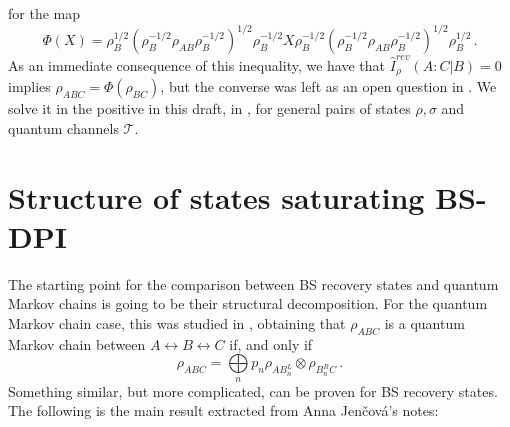 \documentclass[11pt]{article}
\theoremstyle{newdefinition}
\theoremstyle{newplain}
\theoremstyle{myplain}
\DeclareMathOperator{\1}{\mathds{1}}
\begin{document}
for the map
\begin{equation}\label{MapPhi}
    \Phi(X) = \rho_B^{1/2}(\rho_B^{-1/2}\rho_{AB}\rho_B^{-1/2})^{1/2}\rho_B^{-1/2}X\rho_B^{-1/2}(\rho_B^{-1/2}\rho_{AB}\rho_B^{-1/2})^{1/2}\rho_B^{1/2} \, . 
\end{equation}
As an immediate consequence of this inequality, we have that $ \widehat{I}^{rev}_{\rho}(A:C | B) = 0$ implies $\rho_{ABC}= \Phi(\rho_{BC}) $, but the converse was left as an open question in \cite{gondolf2024conditional}. We solve it in the positive in this draft, in , for general pairs of states $\rho, \sigma$ and quantum channels $\mathcal{T}$. 



\section{Structure of states saturating BS-DPI}

The starting point for the comparison between BS recovery states and quantum Markov chains is going to be their structural decomposition. For the quantum Markov chain case, this was studied in \cite{HaydenJozsaPetzWinter-StrongSubadditivity-2004}, obtaining that $\rho_{ABC}$ is a quantum Markov chain between $A \leftrightarrow B \leftrightarrow C $ if, and only if
\begin{equation}
    \rho_{ABC} = \underset{n }{\bigoplus} p_n \rho_{AB_n^L} \otimes  \rho_{B_n^R C} \, .
\end{equation}
Something similar, but more complicated, can be proven for BS recovery states. The following is the main result extracted from Anna Jen{\v c}ová's notes:
\end{document}
